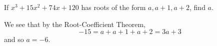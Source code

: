 \documentclass[11pt,dvipsnames]{book}
\numberwithin{figure}{section} %
\numberwithin{table}{section} %
\begin{document}
\begin{exercise}
\begin{itemize}
%
%
%
%
\end{itemize}
\end{exercise}

%
%

\begin{exercise} If $x^3+15x^2+74x+120$ has roots of the form $a,a+1,a+2$, find $a$.

\begin{solution}
We see that by the Root-Coefficient Theorem,
\[
-15=a+a+1+a+2=3a+3\]
and so $a=-6$.
\end{solution}

\end{exercise}
\end{document}
